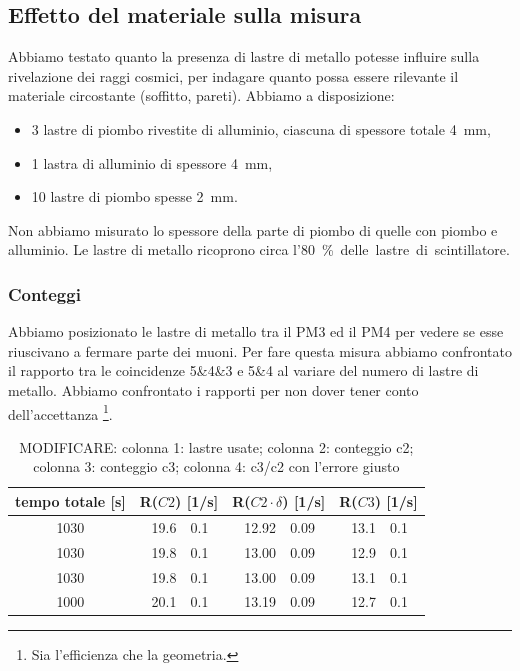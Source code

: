 \subsection{Effetto del materiale sulla misura}

Abbiamo testato quanto la presenza di lastre di metallo potesse influire sulla rivelazione dei raggi cosmici,
per indagare quanto possa essere rilevante il materiale circostante (soffitto, pareti).
Abbiamo a disposizione:
\begin{itemize}
	\item 3 lastre di piombo rivestite di alluminio, ciascuna di spessore totale \SI{4}{mm},
	\item 1 lastra di alluminio di spessore \SI{4}{mm},
	\item 10 lastre di piombo spesse \SI{2}{mm}.
\end{itemize}
Non abbiamo misurato lo spessore della parte di piombo di quelle con piombo e alluminio.
Le lastre di metallo ricoprono circa l'\SI{80}\% delle lastre di scintillatore. 

\subsubsection{Conteggi}

Abbiamo posizionato le lastre di metallo tra il PM3 ed il PM4
per vedere se esse riuscivano a fermare parte dei muoni.
Per fare questa misura abbiamo confrontato il rapporto tra le coincidenze 5\&4\&3 e 5\&4
al variare del numero di lastre di metallo.
Abbiamo confrontato i rapporti per non dover tener conto dell'accettanza%
\footnote{Sia l'efficienza che la geometria.}.

\begin{table}[h]
\centering
\begin{tabular}{| c | r @{$\pm$} l | r @{$\pm$} l | r @{$\pm$} l |}
\hline
tempo totale [\si{s}] & \multicolumn{2}{c|}{R($C2$) [1/\si{s}]} & \multicolumn{2}{c|}{R($C2\cdot \delta$) [1/\si{s}]} & \multicolumn{2}{c|}{R($C3$) [1/\si{s}]} \\
\hline
1030 & 19.6&0.1 & 12.92&0.09 & 13.1&0.1 \\
1030 & 19.8&0.1 & 13.00&0.09 & 12.9&0.1 \\
1030 & 19.8&0.1 & 13.00&0.09 & 13.1&0.1 \\
1000 & 20.1&0.1 & 13.19&0.09 & 12.7&0.1 \\
\hline
\end{tabular}
\caption{MODIFICARE:
colonna 1: lastre usate;
colonna 2: conteggio c2;
colonna 3: conteggio c3;
colonna 4: c3/c2 con l'errore giusto}
\label{dati cfr}
\end{table}


